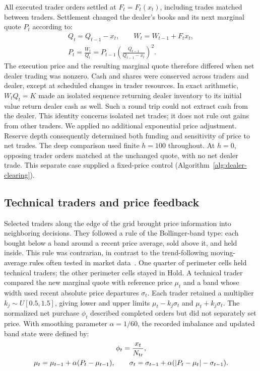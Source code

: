 All executed trader orders settled at $F_t=F_t(x_t)$, including trades
matched between traders. Settlement changed the dealer's books and its
next marginal quote $P_t$ according to:
\begin{gather}
 Q_t=Q_{t-1}-x_t,\qquad W_t=W_{t-1}+F_tx_t,
 \label{eq:dealer-ledger}\\
 P_t=\frac{W_t}{Q_t}
     =P_{t-1}\left(\frac{Q_{t-1}}{Q_{t-1}-x_t}\right)^2.
 \label{eq:price-update}
\end{gather}
The execution price and the resulting marginal quote therefore differed
when net dealer trading was nonzero. Cash and shares were conserved
across traders and dealer, except at scheduled changes in trader
resources. In exact arithmetic, $W_tQ_t=K$ made an isolated sequence
returning dealer inventory to its initial value return dealer cash as
well. Such a round trip could not extract cash from the dealer. This
identity concerns isolated net trades; it does not rule out gains from
other traders. We applied no additional exponential price adjustment.
Reserve depth consequently determined both funding and sensitivity of
price to net trades. The deep comparison used finite $h=100$ throughout.
At $h=0$, opposing trader orders matched at the unchanged quote, with
no net dealer trade. This separate case supplied a fixed-price control
(Algorithm~\ref{alg:dealer-clearing}).

\subsection{Technical traders and price feedback}

Selected traders along the edge of the grid brought price information
into neighboring decisions. They followed a rule of the Bollinger-band
type: each bought below a band around a recent price average, sold above
it, and held inside. This rule was contrarian, in contrast to the
trend-following moving-average rules often tested in market
data~\cite{brock1992simple}. One quarter of perimeter cells held technical
traders; the other perimeter cells stayed in Hold. A technical trader
compared the new marginal quote with reference price $\mu_t$ and a band
whose width used recent absolute price departures $\sigma_t$.
Each trader retained a multiplier $k_j\sim U[0.5,1.5]$, giving lower
and upper limits $\mu_t-k_j\sigma_t$ and $\mu_t+k_j\sigma_t$.
The normalized net purchase $\phi_t$ described completed orders but did
not separately set price. With smoothing parameter $\alpha=1/60$, the
recorded imbalance and updated band state were defined by:
\begin{gather}
 \phi_t=\frac{x_t}{N_{\rm tr}},
 \label{eq:imbalance}\\
 \mu_t=\mu_{t-1}+\alpha(P_t-\mu_{t-1}),\qquad
 \sigma_t=\sigma_{t-1}+\alpha(|P_t-\mu_t|-\sigma_{t-1}).
 \label{eq:adaptive-band}
\end{gather}


